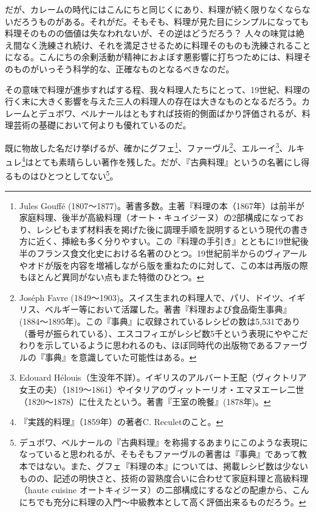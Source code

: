 \begin{Main}
だが、カレームの時代にはこんにちと同じくにあり、料理が続く限りなくならないだろうものがある。それがだ。そもそも、料理が見た目にシンプルになっても料理そのものの価値は失なわれないが、その逆はどうだろう？
人々の味覚は絶え間なく洗練され続け、それを満足させるために料理そのものも洗練されることになる。こんにちの余剰活動が精神におよぼす悪影響に打ちつためには、料理そのものがいっそう科学的な、正確なものとなるべきなのだ。

その意味で料理が進歩すればする程、我々料理人たちにとって、19世紀、料理の行く末に大きく影響を与えた三人の料理人の存在は大きなものとなるだろう。カレームとデュボワ、ベルナールはともすれば技術的側面ばかり評価されるが、料理芸術の基礎において何よりも優れているのだ。

既に物故した名だけ挙げるが、確かにグフェ\footnote{Jules Gouffé
  (1807〜1877)。著書多数。主著『料理の本（1867年）は前半が家庭料理、後半が高級料理（オート・キュイジーヌ）の2部構成になっており、レシピもまず材料表を掲げた後に調理手順を説明するという現代の書き方に近く、挿絵も多く分りやすい。この『料理の手引き』とともに19世紀後半のフランス食文化史における名著のひとつ。19世紀前半からのヴィアールやオドが版を内容を増補しながら版を重ねたのに対して、この本は再版の際もほとんど異同がない点もまた特徴のひとつ。}、ファーヴル\footnote{Joséph
  Favre
  (1849〜1903)。スイス生まれの料理人で、パリ、ドイツ、イギリス、ベルギー等において活躍した。著書『料理および食品衛生事典』
  (1884〜1895年)。この『事典』に収録されているレシピの数は5,531であり（番号が振られている）、エスコフィエがレシピ数5千という表現にややこだわりを示しているように思われるのも、ほぼ同時代の出版物であるファーヴルの『事典』を意識していた可能性はある。}、エルーイ\footnote{Edouard
  Hélouis（生没年不詳）。イギリスのアルバート王配（ヴィクトリア女王の夫）（1819〜1861）やイタリアのヴィットーリオ・エマヌエーレ二世（1820〜1878）に仕えたという。著書『王室の晩餐』(1878年)。}、ルキュレ\footnote{『実践的料理』（1859年）の著者C.
  Reculetのこと。}はとても素晴らしい著作を残した。だが、『古典料理』というの名著にし得るものはひとつとしてない\footnote{デュボワ、ベルナールの『古典料理』を称揚するあまりにこのような表現になっていると思われるが、そもそもファーヴルの著書は『事典』であって教本ではない。また、グフェ『料理の本』については、掲載レシピ数は少ないものの、記述の明快さと、技術の習熟度合いに合わせて家庭料理と高級料理（haute
  cuisine
  オートキィジーヌ）の二部構成にするなどの配慮から、こんにちでも充分に料理の入門〜中級教本として高く評価出来るものだろう。}。


\end{Main}
